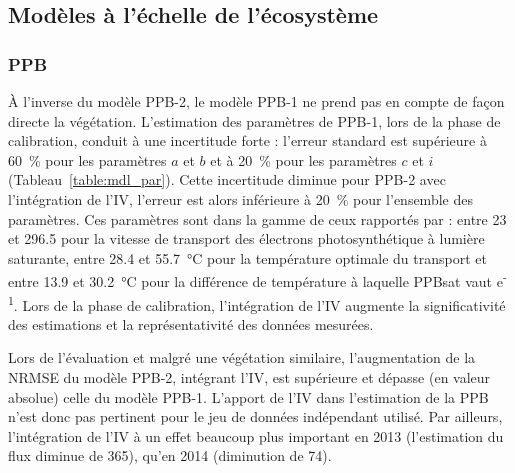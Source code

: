 \subsection{Modèles à l'échelle de l'écosystème}

\subsubsection{PPB}


À l'inverse du modèle PPB-2, le modèle PPB-1 ne prend pas en compte de façon directe la végétation.
L'estimation des paramètres de PPB-1, lors de la phase de calibration, conduit à une incertitude forte : l'erreur standard est supérieure à \SI{60}{\percent} pour les paramètres $a$ et $b$ et à \SI{20}{\percent} pour les paramètres $c$ et $i$ (Tableau~\ref{table:mdl_par}).
Cette incertitude diminue pour PPB-2 avec l'intégration de l'IV, l'erreur est alors inférieure à \SI{20}{\percent} pour l'ensemble des paramètres.
Ces paramètres sont dans la gamme de ceux rapportés par \citet{june2004} : entre \num{23} et \SI{296.5}{\umle} pour la vitesse de transport des électrons photosynthétique à lumière saturante, entre \num{28.4} et \SI{55.7}{\degreeCelsius} pour la température optimale du transport et entre \num{13.9} et \SI{30.2}{\degreeCelsius} pour la différence de température à laquelle PPBsat vaut e\textsuperscript{-1}.
Lors de la phase de calibration, l'intégration de l'IV augmente la significativité des estimations et la représentativité des données mesurées.

Lors de l'évaluation et malgré une végétation similaire, l'augmentation de la NRMSE du modèle PPB-2, intégrant l'IV, est supérieure et dépasse (en valeur absolue) celle du modèle PPB-1. 
L'apport de l'IV dans l'estimation de la PPB n'est donc pas pertinent pour le jeu de données indépendant utilisé.
Par ailleurs, l'intégration de l'IV à un effet beaucoup plus important en 2013 (l'estimation du flux diminue de \SI{365}{\gcma}), qu'en 2014 (diminution de \SI{74}{\gcma}).
%

%

